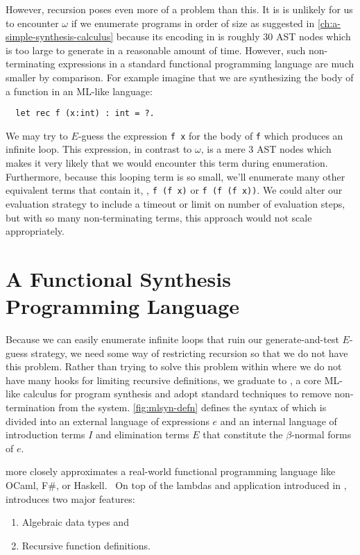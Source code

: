 However, recursion poses even more of a problem than this.
It is is unlikely for us to encounter $ω$ if we enumerate programs in order of size as suggested in \autoref{ch:a-simple-synthesis-calculus} because its encoding in \lsyn{} is roughly 30 AST nodes which is too large to generate in a reasonable amount of time.
However, such non-terminating expressions in a standard functional programming language are much smaller by comparison.
For example imagine that we are synthesizing the body of a function in an ML-like language:
\begin{lstlisting}
  let rec f (x:int) : int = ?.
\end{lstlisting}
We may try to $E$-guess the expression \lstinline|f x| for the body of \lstinline|f| which produces an infinite loop.
This expression, in contrast to $ω$, is a mere 3 AST nodes which makes it very likely that we would encounter this term during enumeration.
Furthermore, because this looping term is so small, we'll enumerate many other equivalent terms that contain it, \eg, \lstinline|f (f x)| or \lstinline|f (f (f x))|.
We could alter our evaluation strategy to include a timeout or limit on number of evaluation steps, but with so many non-terminating terms, this approach would not scale appropriately.

\section{A Functional Synthesis Programming Language}



Because we can easily enumerate infinite loops that ruin our generate-and-test $E$-guess strategy, we need some way of restricting recursion so that we do not have this problem.
Rather than trying to solve this problem within \lsyn{} where we do not have many hooks for limiting recursive definitions, we graduate to \mlsyn{}, a core ML-like calculus for program synthesis and adopt standard techniques to remove non-termination from the system.
\autoref{fig:mlsyn-defn} defines the syntax of \mlsyn{} which is divided into an external language of expressions $e$ and an internal language of introduction terms $I$ and elimination terms $E$ that constitute the $β$-normal forms of $e$.

\mlsyn{} more closely approximates a real-world functional programming language like OCaml, F\#, or Haskell.~
On top of the lambdas and application introduced in \lsyn{}, \mlsyn{} introduces two major features:
\begin{enumerate}
  \item Algebraic data types and
  \item Recursive function definitions.
\end{enumerate}

